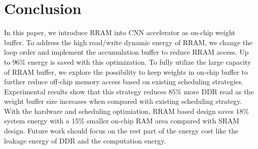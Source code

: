 \section{Conclusion}\label{sec:conclusion}

In this paper, we introduce RRAM into CNN accelerator as on-chip weight buffer. To address the high read/write dynamic energy of RRAM, we change the loop order and implement the accumulation buffer to reduce RRAM access. Up to $96\%$ energy is saved with this optimization. To fully utilize the large capacity of RRAM buffer, we explore the possibility to keep weights in on-chip buffer to further reduce off-chip memory access based on existing scheduling strategies. Experimental results show that this strategy reduces $85\%$ more DDR read as the weight buffer size increases when compared with existing scheduling strategy. With the hardware and scheduling optimiation, RRAM based design saves $18\%$ system energy with a $15\%$ smaller on-chip RAM area compared with SRAM design. Future work should focus on the rest part of the energy cost like the leakage energy of DDR and the computation energy.